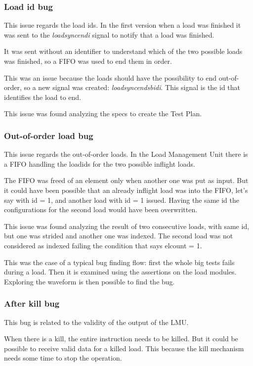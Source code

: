 \subsubsection{Load id bug}
This issue regards the load ids. In the first version when a load was finished it was sent to the \emph{load\+sync\+end\+i} signal to notify that a load was finished.

It was sent without an identifier to understand which of the two possible loads was finished, so a FIFO was used to end them in order.

This was an issue because the loads should have the possibility to end out-of-order, so a new signal was created: \emph{load\+sync\+end\+sb\+id\+i}. This signal is the id that identifies the load to end.

This issue was found analyzing the specs to create the Test Plan.

\subsubsection{Out-of-order load bug}
This issue regards the out-of-order loads. In the Load Management Unit there is a FIFO handling the load\+ids for the two possible inflight loads.

The FIFO was freed of an element only when another one was put as input. But it could have been possible that an already inflight load was into the FIFO, let's say with id = 1, and another load with id = 1 issued.
Having the same id the configurations for the second load would have been overwritten.

This issue was found analyzing the result of two consecutive loads, with same id, but one was strided and another one was indexed. The second load was not considered as indexed failing the condition that says el\+count = 1.

This was the case of a typical bug finding flow: first the whole big tests fails during a load. Then it is examined using the assertions on the load modules. Exploring the waveform is then possible to find the bug.

\subsubsection{After kill bug}
This bug is related to the validity of the output of the LMU.

When there is a kill, the entire instruction needs to be killed. But it could be possible to receive valid data for a killed load. This because the kill mechanism needs some time to stop the operation.

